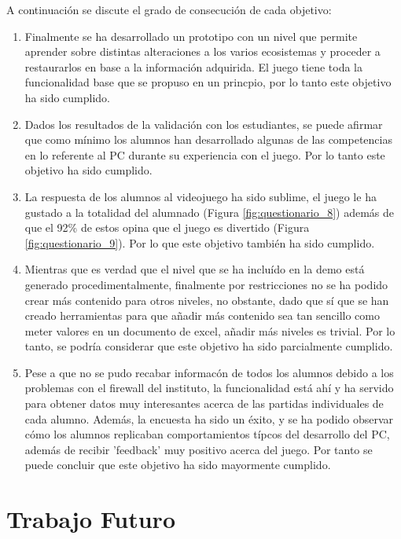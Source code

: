 A continuación se discute el grado de consecución de cada objetivo:
\begin{enumerate}[itemsep=0mm]

\item Finalmente se ha desarrollado un prototipo con un nivel que permite aprender sobre distintas alteraciones a los varios ecosistemas y proceder a restaurarlos en base a la información adquirida. El juego tiene toda la funcionalidad base que se propuso en un princpio, por lo tanto este objetivo ha sido cumplido.

\item Dados los resultados de la validación con los estudiantes, se puede afirmar que como mínimo los alumnos han desarrollado algunas de las competencias en lo referente al PC durante su experiencia con el juego. Por lo tanto este objetivo ha sido cumplido.

\item La respuesta de los alumnos al videojuego ha sido sublime, el juego le ha gustado a la totalidad del alumnado (Figura \ref{fig:questionario_8}) además de que el 92\% de estos opina que el juego es divertido (Figura \ref{fig:questionario_9}). Por lo que este objetivo también ha sido cumplido.

\item Mientras que es verdad que el nivel que se ha incluído en la demo está generado procedimentalmente, finalmente por restricciones no se ha podido crear más contenido para otros niveles, no obstante, dado que sí que se han creado herramientas para que añadir más contenido sea tan sencillo como meter valores en un documento de excel, añadir más niveles es trivial. Por lo tanto, se podría considerar que este objetivo ha sido parcialmente cumplido. 

\item Pese a que no se pudo recabar informacón de todos los alumnos debido a los problemas con el firewall del instituto, la funcionalidad está ahí y ha servido para obtener datos muy interesantes acerca de las partidas individuales de cada alumno. Además, la encuesta ha sido un éxito, y se ha podido observar cómo los alumnos replicaban comportamientos típcos del desarrollo del PC, además de recibir 'feedback' muy positivo acerca del juego. Por tanto se puede concluir que este objetivo ha sido mayormente cumplido.
\end{enumerate}

\section{Trabajo Futuro}

